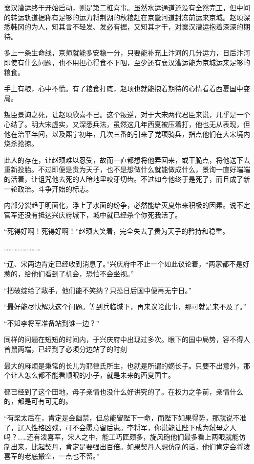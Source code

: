 襄汉漕运终于开始启动，则是第二桩喜事。虽然水运通道还没有全然完工，但中间的转运轨道据称有足够的运力将荆湖的秋粮赶在京畿河道封冻前运来京城。赵顼深悉韩冈的为人，知其言不轻发、发必有据，又知其才干，对襄汉漕运抱着深深的期待。

多上一条生命线，京师就能多安稳一分，只要能补充上汴河的几分运力，日后汴河即使有什么问题，也不用担心得食不下咽，至少还有襄汉漕运能为京城运来足够的粮食。

手上有粮，心中不慌。有了粮食打底，赵顼也就能抱着期待的心情看着西夏国中变局。

叛臣景询之死，让赵顼欣喜不已。这个叛逆，对于大宋两代君臣来说，几乎是一个心结了。明大宋虚实，又深悉兵法，虽然这几年西夏被压着打，他也无从表现，但他在治平年间，以及熙宁初年，几次三番的引来了党项骑兵，指点他们在大宋境内烧杀抢掠。

此人的存在，让赵顼难以忍受，故而一直都想将他弄回来，或干脆点，将他送下去重新投胎。不过即便是贵为天子，也不是想做什么就能做成什么，景询一直好端端的活着，让诅咒他去死的人暗地里咬牙切齿。不过如今他终于是死了，而且成了新一轮政治。斗争开始的标志。

内部分裂趋于明面化，浮上了水面的纷争，必然能给灭夏带来积极的因素。说不定官军还没有抵达兴庆府城下，城中就已经杀个你死我活了。

“死得好啊！死得好啊！”赵顼大笑着，完全失去了贵为天子的矜持和稳重。

……………………

“辽、宋两边肯定已经收到消息了。”兴庆府中不止一个如此议论着，“两家都不是好惹的，给他们看到了机会，恐怕不会坐视。”

“把破绽给了敌手，他们能不笑纳？只恐日后国中便再无宁日。”

“最好能尽快解决这个问题。等到兵临城下，再来议论此事，那可就是来不及了。”

“不知李将军准备站到谁一边？”

同样的问题在短短的时间内，于兴庆府中出现过多次。眼下的国中局势，容不得人首鼠两端，已经到了必须分边站了的时刻

最大的麻烦是秉常的长儿为耶律氏所生，也就是所谓的嫡长子。只要不出意外，那个让人怎么都不能看顺眼的小子，就是未来的西夏国主。

都已经到了这个田地，母子亲情也没什么好讲究的了。在权力之争前，亲情什么的，都是可有可无的。

“有梁太后在，肯定是会幽禁，但总能留陛下一命，而陛下如果得势，那就说不准了，辽人性格凶残，可不会愿意留后患。李将军，你说能让陛下成为弑母之人吗？……还有泼喜军，宋人之中，能工巧匠颇多，旋风砲他们最多看上两眼就能仿制出来，比起契丹，肯定是要强出百倍。如果契丹人想仿制的话，他们肯定会将泼喜军的老底搬空，一点也不留。”


